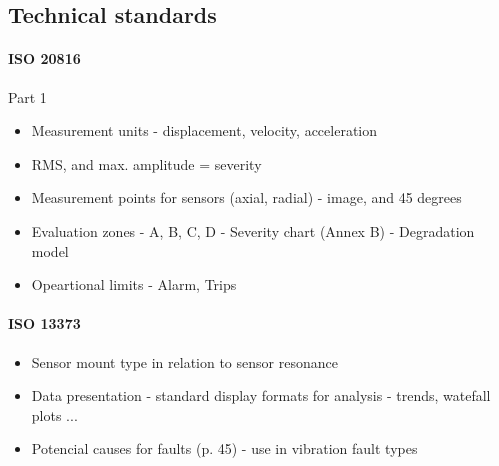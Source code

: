 \subsection{Technical standards}
\paragraph{ISO 20816}
\cite{noauthor_iso_2016}
Part 1
\begin{itemize}
\item Measurement units - displacement, velocity, acceleration
\item RMS, and max. amplitude = severity
\item Measurement points for sensors (axial, radial) - image, and 45 degrees
\item Evaluation zones - A, B, C, D - Severity chart (Annex B) - Degradation model
\item Opeartional limits - Alarm, Trips
\end{itemize}

\paragraph{ISO 13373}
\cite{noauthor_iso_2016}
\cite{noauthor_iso_2016-1}

\cite{jack_d_frequency_nodate}
\begin{itemize}
\item Sensor mount type in relation to sensor resonance
\item Data presentation - standard display formats for analysis - trends, watefall plots ...
\item Potencial causes for faults (p. 45) - use in vibration fault types
\end{itemize}
 
